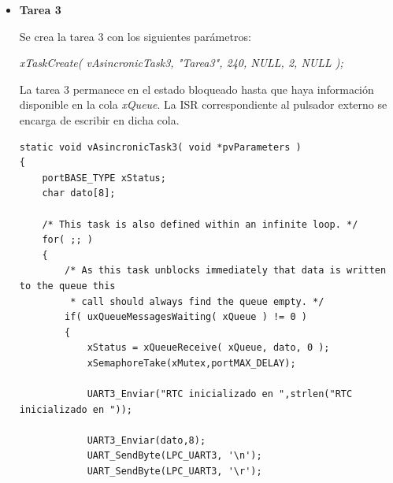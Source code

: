 \documentclass[a4paper,12pt]{article}
\begin{document}
\begin{itemize}
\begin{verbatim}
	/* Inicializacion del puntero al buffer de recepcion */
	buffer = &RxBuffer;

	/* As per most tasks, this task is implemented within an infinite loop. */
	for( ;; )
	{
		/* Use the semaphore to wait for the event. The semaphore was created
		 * before the scheduler was started so before this task ran for the first
		 * time. The task blocks indefinitely meaning this function call will only
		 * return once the semaphore has been successfully obtained - so there is no
		 * need to check the returned value. */
		xSemaphoreTake( xCountingSemaphore, portMAX_DELAY );
		xSemaphoreTake(xMutex,portMAX_DELAY);

		/* Envia por la UART3 el mensaje constante. */
		UART3_Enviar(TextForTask2,strlen(TextForTask2));

		UART3_Enviar(buffer,1);
		UART_SendByte(LPC_UART3, '\n'); UART_SendByte(LPC_UART3, '\r');

		xSemaphoreGive(xMutex);
	}
}

\end{verbatim}

\item{\textbf{Tarea 3}}

Se crea la tarea 3 con los siguientes parámetros:

\begin{center}
\textit{xTaskCreate( vAsincronicTask3, "Tarea3", 240, NULL, 2, NULL );}
\end{center}

La tarea 3 permanece en el estado bloqueado hasta que haya información disponible en la cola {\textit{xQueue}}.  La ISR correspondiente al pulsador externo se encarga de escribir en dicha cola.

\begin{verbatim}
static void vAsincronicTask3( void *pvParameters )
{
	portBASE_TYPE xStatus;
	char dato[8];

	/* This task is also defined within an infinite loop. */
	for( ;; )
	{
		/* As this task unblocks immediately that data is written to the queue this
		 * call should always find the queue empty. */
		if( uxQueueMessagesWaiting( xQueue ) != 0 )
		{
			xStatus = xQueueReceive( xQueue, dato, 0 );
			xSemaphoreTake(xMutex,portMAX_DELAY);

			UART3_Enviar("RTC inicializado en ",strlen("RTC inicializado en "));

			UART3_Enviar(dato,8);
			UART_SendByte(LPC_UART3, '\n');
			UART_SendByte(LPC_UART3, '\r');


\end{verbatim}
\end{itemize}
\end{document}
